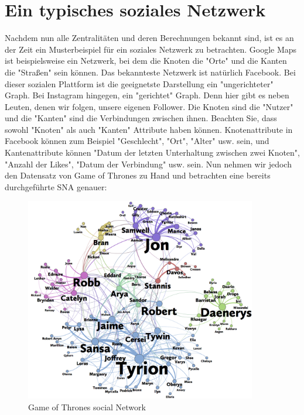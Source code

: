 \section{Ein typisches soziales Netzwerk}
Nachdem nun alle Zentralitäten und deren Berechnungen bekannt sind, ist es an der Zeit ein Musterbeispiel für ein soziales Netzwerk zu betrachten. Google Maps ist beispielsweise ein Netzwerk, bei dem die Knoten die "Orte" und die Kanten die "Straßen" sein können. Das bekannteste Netzwerk ist natürlich Facebook. Bei dieser sozialen Plattform ist die geeignetste Darstellung ein "ungerichteter" Graph. Bei Instagram hingegen, ein "gerichtet" Graph. Denn hier gibt es neben Leuten, denen wir folgen, unsere eigenen Follower. Die Knoten sind die "Nutzer" und die "Kanten" sind die Verbindungen zwischen ihnen. Beachten Sie, dass sowohl "Knoten" als auch "Kanten" Attribute haben können. Knotenattribute in Facebook können zum Beispiel "Geschlecht", "Ort", "Alter" usw. sein, und Kantenattribute können "Datum der letzten Unterhaltung zwischen zwei Knoten", "Anzahl der Likes", "Datum der Verbindung" usw. sein.
Nun nehmen wir jedoch den Datensatz von Game of Thrones zu Hand und betrachten eine bereits durchgeführte SNA genauer:

\begin{figure}[h!]
    \centering
    \includegraphics[width=0.9\textwidth]{Graphics/got-network.png}
    \caption{Game of Thrones social Network}
    \label{fig:GameOfThrones}
\end{figure}

